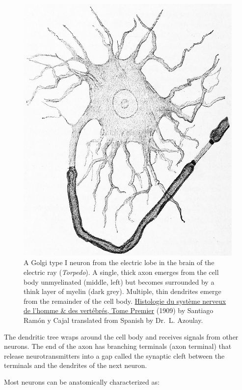 \begin{figure}

{\centering \includegraphics[width=0.7\linewidth]{./figures/cells/CajalMyelinAxon} 

}

\caption{A Golgi type I neuron from the electric lobe in the brain of the electric ray (\emph{Torpedo}). A single, thick axon emerges from the cell body unmyelinated (middle, left) but becomes surrounded by a think layer of myelin (dark grey). Multiple, thin dendrites emerge from the remainder of the cell body. \href{https://wellcomelibrary.org/item/b2129592x\#?c=0\&m=0\&s=0\&cv=14\&z=0\%2C-3.48\%2C1\%2C8.6591}{Histologie du système nerveux de l'homme \& des vertébrés, Tome Premier} (1909) by Santiago Ramón y Cajal translated from Spanish by Dr.~L. Azoulay.}\label{fig:axonmyelinated}
\end{figure}

The dendritic tree wraps around the cell body and receives signals from other neurons. The end of the axon has branching terminals (axon terminal) that release neurotransmitters into a gap called the synaptic cleft between the terminals and the dendrites of the next neuron.

Most neurons can be anatomically characterized as:

